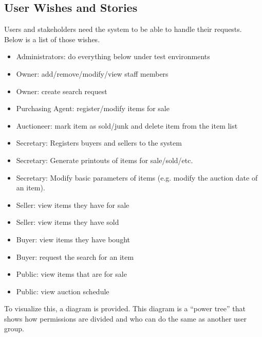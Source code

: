 \subsection{User Wishes and Stories}
Users and stakeholders need the system to be able to handle their requests. Below is a list of those wishes.
\begin{itemize}[noitemsep]
	\item Administrators: do everything below under test environments
	\item Owner: add/remove/modify/view staff members
	\item Owner: create search request
	\item Purchasing Agent: register/modify items for sale
	\item Auctioneer: mark item as sold/junk and delete item from the item list
	\item Secretary: Registers buyers and sellers to the system
	\item Secretary: Generate printouts of items for sale/sold/etc.
	\item Secretary: Modify basic parameters of items (e.g. modify the auction date of an item).
	\item Seller: view items they have for sale
	\item Seller: view items they have sold
	\item Buyer: view items they have bought
	\item Buyer: request the search for an item
	\item Public: view items that are for sale
	\item Public: view auction schedule
\end{itemize}
To visualize this, a diagram is provided. This diagram is a ``power tree'' that shows how permissions are divided and who can do the same as another user group.
